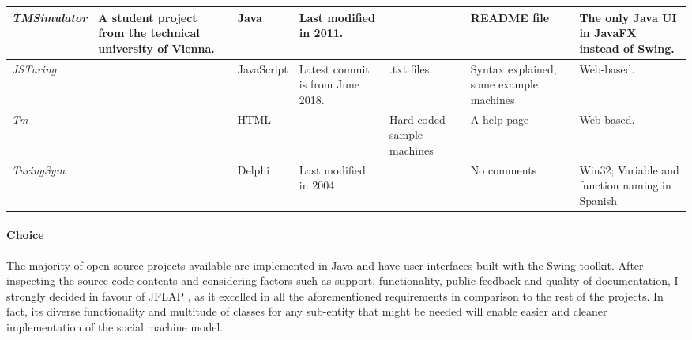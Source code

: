 \documentclass[12pt,a4,xcolor=table]{article}
\begin{document}
{\begin{table}[]
\begin{tabular}{|m{0.73in} |m{1in}|m{0.6in}|m{0.9in}|m{1in}|m{0.5in}|m{1in}|}
			\textit{TMSimulator} & A student project from the technical university of Vienna. & Java & Last modified in 2011. &  & README file & The only Java UI in JavaFX instead of Swing.   \\ \hline
			\textit{JSTuring} &  & JavaScript & Latest commit is from June 2018. & .txt files. & Syntax explained, some example machines & Web-based.  \\ \hline
			\textit{Tm} &  & HTML &  & Hard-coded sample machines & A help page & Web-based. \\ \hline
			\textit{TuringSym} &  & Delphi & Last modified in 2004 &  & No comments & Win32; Variable and function naming in Spanish \\ \hline
		\end{tabular}
	\end{table}
	\paragraph{Choice}
	The majority of open source projects available are implemented in Java and have user interfaces built with the Swing toolkit. After inspecting the source code contents and considering factors such as support, functionality, public feedback and quality of documentation, I strongly decided in favour of JFLAP \cite{rodger2006jflap}, as it excelled in all the aforementioned requirements in comparison to the rest of the projects. In fact, its diverse functionality and multitude of classes for any sub-entity that might be needed will enable easier and cleaner implementation of the social machine model.
}
	
	
	
\end{document}
